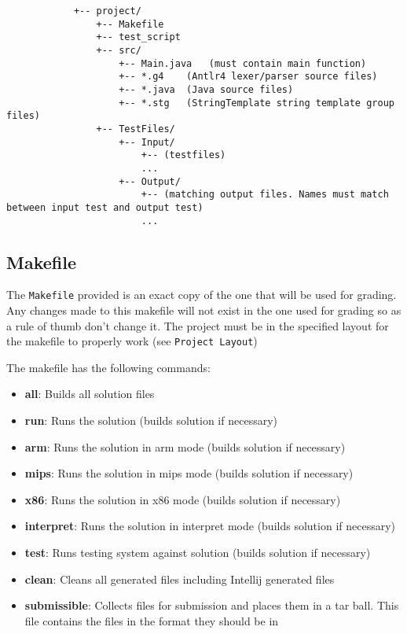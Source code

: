 \documentclass{article}
\begin{document}
		\begin{lstlisting}
			+-- project/
				+-- Makefile
				+-- test_script
				+-- src/
					+-- Main.java	(must contain main function)
					+-- *.g4	(Antlr4 lexer/parser source files)
					+-- *.java	(Java source files)
					+-- *.stg	(StringTemplate string template group files)
				+-- TestFiles/
					+-- Input/
						+-- (testfiles)
						...
					+-- Output/
						+-- (matching output files. Names must match between input test and output test)
						...
		\end{lstlisting}


	\subsection{Makefile}
	
		The \texttt{Makefile} provided is an exact copy of the one that will be used for grading.  Any changes made to
		this makefile will not exist in the one used for grading so as a rule of thumb don't change it. The project must
		be in the specified layout for the makefile to properly work (see \texttt{Project Layout})
		
		The makefile has the following commands:
		
		\begin{itemize}
			\item{\textbf{all}}: Builds all solution files
			\item{\textbf{run}}: Runs the solution (builds solution if necessary)
			\item{\textbf{arm}}: Runs the solution in arm mode (builds solution if necessary)
			\item{\textbf{mips}}: Runs the solution in mips mode (builds solution if necessary)
			\item{\textbf{x86}}: Runs the solution in x86 mode (builds solution if necessary)
			\item{\textbf{interpret}}: Runs the solution in interpret mode (builds solution if necessary)
			\item{\textbf{test}}: Runs testing system against solution (builds solution if necessary)
			\item{\textbf{clean}}: Cleans all generated files including Intellij generated files
			\item{\textbf{submissible}}: Collects files for submission and places them in a tar ball. This file contains
			the files in the format they should be in
		\end{itemize}
\end{document}

